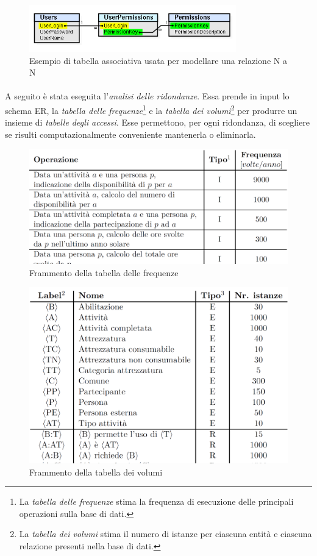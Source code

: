\documentclass[12pt,a4paper,twoside,english,italian]{book}
\begin{document}
\begin{figure}[H]
    \centering
    \includegraphics[width=0.8\textwidth]{img/junction_table.png}
    \caption{Esempio di tabella associativa usata per modellare una relazione N a N}
\end{figure}

\paragraph{} A seguito è stata eseguita l'\emph{analisi delle ridondanze}. Essa prende in input lo schema ER, la \emph{tabella delle frequenze}\footnote{La \emph{tabella delle frequenze} stima la frequenza di esecuzione delle principali operazioni sulla base di dati.} e la \emph{tabella dei volumi}\footnote{La \emph{tabella dei volumi} stima il numero di istanze per ciascuna entità e ciascuna relazione presenti nella base di dati.} per produrre un insieme di \emph{tabelle degli accessi}. Esse permettono, per ogni ridondanza, di scegliere se risulti computazionalmente conveniente mantenerla o eliminarla. 

\begin{figure}[H]
    \centering
    \includegraphics[width=.65\textwidth]{img/tab_frequenze.png}
    \caption{Frammento della tabella delle frequenze}
\end{figure}

\newpage


\begin{figure}[H]
    \centering
    \includegraphics[width=.65\textwidth]{img/tab_volumi.png}
    \caption{Frammento della tabella dei volumi}
\end{figure}
\end{document}
